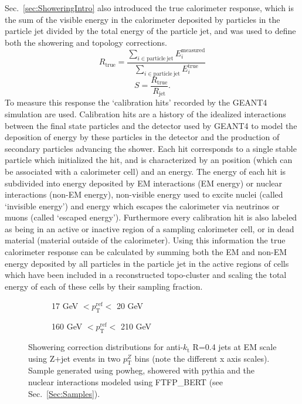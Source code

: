 Sec.~\ref{sec:ShoweringIntro} also introduced the true calorimeter response, which is the sum of the visible energy in the calorimeter deposited by particles in the particle jet divided by the total energy of the particle jet, and was used to define both the showering and topology corrections.  
\begin{equation}
  R_{\mathrm{true}} = \frac{\sum_{i\in{\mathrm{particle~jet}}} E_i^{\mathrm{measured}}}{\sum_{i\in{\mathrm{particle~jet}}}E_i^{\mathrm{true}}}
\end{equation}
\begin{equation}
  S = \frac{R_{\mathrm{true}}}{R_{\mathrm{jet}}}.
\end{equation}
To measure this response the `calibration hits' recorded by the GEANT4 simulation are used.  
Calibration hits are a history of the idealized interactions between the final state particles and the detector used by GEANT4 to model the deposition of energy by these particles in the detector and the production of secondary particles advancing the shower.  
Each hit corresponds to a single stable particle which initialized the hit, and is characterized by an position (which can be associated with a calorimeter cell) and an energy.  
The energy of each hit is subdivided into energy deposited by EM interactions (EM energy) or nuclear interactions (non-EM energy), non-visible energy used to excite nuclei (called `invisible energy') and energy which escapes the calorimeter via neutrinos or muons (called `escaped energy').  
Furthermore every calibration hit is also labeled as being in an active or inactive region of a sampling calorimeter cell, or in dead material (material outside of the calorimeter).  
Using this information the true calorimeter response can be calculated by summing both the EM and non-EM energy deposited by all particles in the particle jet in the active regions of cells which have been included in a reconstructed topo-cluster and scaling the total energy of each of these cells by their sampling fraction.   
 

\begin{figure}[!ht]
  \centering
  \begin{subfigure}{.5\textwidth}
    \centering
    \caption{17 GeV $< p_{\mathrm{T}}^{\mathrm{ref}} < $ 20 GeV}
  \end{subfigure}%
  \begin{subfigure}{.5\textwidth}  \centering
    \caption{160 GeV $< p_{\mathrm{T}}^{\mathrm{ref}} < $ 210 GeV}
  \end{subfigure}
 \caption[Example showering correction distributions]
 {\small Showering correction distributions for anti-$k_{\mathrm t}$ R=0.4 jets at EM scale using Z+jet events in two $p_{\mathrm T}^Z$ bins (note the different x axis scales).  Sample generated using {\sc powheg}, showered with {\sc pythia} and the nuclear interactions modeled using FTFP\_BERT (see Sec.~\ref{Sec:Samples}).   }
 \label{Fig:ShoweringDistExample}
\end{figure}

